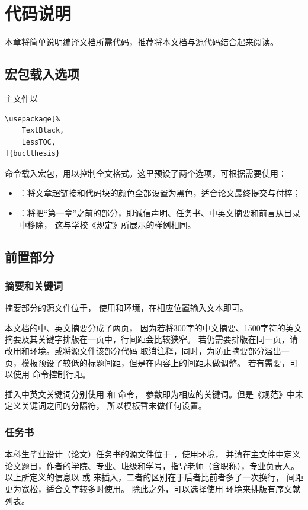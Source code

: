 \chapter{代码说明}\label{chap:CodeIntro}
本章将简单说明编译文档所需代码，推荐将本文档与源代码结合起来阅读。

\section{宏包载入选项}\label{sec:loadsty}
主文件以
\begin{lstlisting}
\usepackage[%
	TextBlack,
	LessTOC,
]{buctthesis}
\end{lstlisting}
命令载入宏包，用以控制全文格式。这里预设了两个选项，可根据需要使用：
\begin{itemize}
	\item {}：将文章超链接和代码块的颜色全部设置为黑色，适合论文最终提交与付梓；
	\item {}：将把“第一章”之前的部分，即诚信声明、任务书、中英文摘要和前言从目录中移除，
	这与学校《规定》所展示的样例相同。
\end{itemize}


\section{前置部分}\label{sec:frontmatter}
\subsection{摘要和关键词}\label{subsec:abstract}
摘要部分的源文件位于，
使用和环境，在相应位置输入文本即可。

本文档的中、英文摘要分成了两页，
因为若将300字的中文摘要、1500字符的英文摘要及其关键字排版在一页中，行间距会比较狭窄。
若仍需要排版在同一页，请改用和环境。或将源文件该部分代码
取消注释，同时，为防止摘要部分溢出一页，模板预设了较低的标题间距，但是在内容上的间距未做调整。
若有需要，可以使用  命令控制行距。

插入中英文关键词分别使用 和 命令，
参数即为相应的关键词。但是《规范》中未定义关键词之间的分隔符，
所以模板暂未做任何设置。

\subsection{任务书}\label{subsec:taskbook}
本科生毕业设计（论文）任务书的源文件位于 ，使用环境，
并请在主文件中定义论文题目，作者的学院、专业、班级和学号，指导老师（含职称），专业负责人。
以上所定义的信息以  或  来插入，二者的区别在于后者比前者多了一次换行，
间距更为宽松，适合文字较多时使用。
除此之外，可以选择使用  环境来排版有序文献列表。

